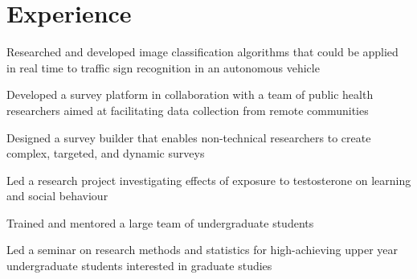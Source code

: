 \documentclass[]{chowes-resume}
\begin{document}
\begin{minipage}[t]{0.66\textwidth} 


\section{Experience}

\vspace{\topsep} %
\begin{tightemize}
\item Researched and developed image classification algorithms that could be applied in real time to traffic sign recognition in an autonomous vehicle
\end{tightemize}
\sectionsep

\begin{tightemize}
\item Developed a survey platform in collaboration with a team of public health researchers aimed at facilitating data collection from remote communities
\item Designed a survey builder that enables non-technical researchers to create complex, targeted, and dynamic surveys

\end{tightemize}
\sectionsep

\begin{tightemize}
\item Led a research project investigating effects of exposure to testosterone on learning and social behaviour
\item Trained and mentored a large team of undergraduate students
\end{tightemize}
\sectionsep

\begin{tightemize}
\item Led a seminar on research methods and statistics for high-achieving upper year undergraduate students interested in graduate studies
\end{tightemize}
\sectionsep


\end{minipage}
\end{document}
